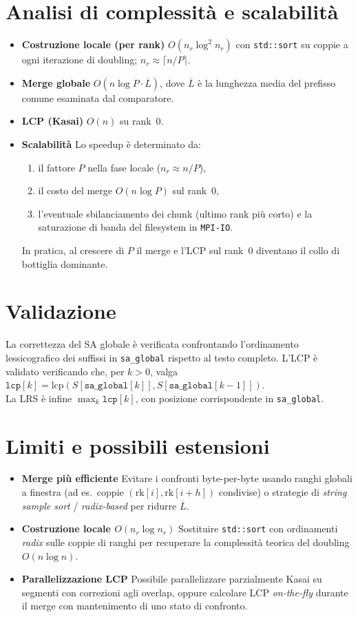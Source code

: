 	\section{Analisi di complessità e scalabilità}
		\begin{itemize}
			\item \textbf{Costruzione locale (per rank)} $O(n_r \log^2 n_r)$ con \texttt{std::sort} su coppie a ogni iterazione di doubling; $n_r \approx \lceil n/P \rceil$.
			\item \textbf{Merge globale} $O(n \log P \cdot \overline{L})$, dove $\overline{L}$ è la lunghezza media del prefisso comune esaminata dal comparatore.
			\item \textbf{LCP (Kasai)} $O(n)$ su rank~0.
			\item \textbf{Scalabilità} Lo speedup è determinato da:
			\begin{enumerate}
				\item il fattore $P$ nella fase locale ($n_r \approx n/P$),
				\item il costo del merge $O(n \log P)$ sul rank~0,
				\item l'eventuale sbilanciamento dei chunk (ultimo rank più corto) e la saturazione di banda del filesystem in \texttt{MPI-IO}.
			\end{enumerate}
			
			In pratica, al crescere di $P$ il merge e l'LCP sul rank~0 diventano il collo di bottiglia dominante.
		\end{itemize}
	
	\section{Validazione}
		La correttezza del SA globale è verificata confrontando l'ordinamento lessicografico dei suffissi in \texttt{sa\_global} rispetto al testo completo.
		L'LCP è validato verificando che, per $k>0$, valga $\texttt{lcp}[k] = \mathrm{lcp}(S[\texttt{sa\_global}[k]], S[\texttt{sa\_global}[k-1]])$. \\
		La LRS è infine $\max_k \texttt{lcp}[k]$, con posizione corrispondente in \texttt{sa\_global}.
	
	\section{Limiti e possibili estensioni}
		\begin{itemize}
			\item \textbf{Merge più efficiente} Evitare i confronti byte-per-byte usando ranghi globali a finestra (ad es.\ coppie $(\mathrm{rk}[i], \mathrm{rk}[i+h])$ condivise) o strategie di \emph{string sample sort} / \emph{radix-based} per ridurre $\overline{L}$.
			\item \textbf{Costruzione locale $O(n_r \log n_r)$} Sostituire \texttt{std::sort} con ordinamenti \emph{radix} sulle coppie di ranghi per recuperare la complessità teorica del doubling $O(n \log n)$.
			\item \textbf{Parallelizzazione LCP} Possibile parallelizzare parzialmente Kasai su segmenti con correzioni agli overlap, oppure calcolare LCP \emph{on-the-fly} durante il merge con mantenimento di uno stato di confronto.
		\end{itemize}